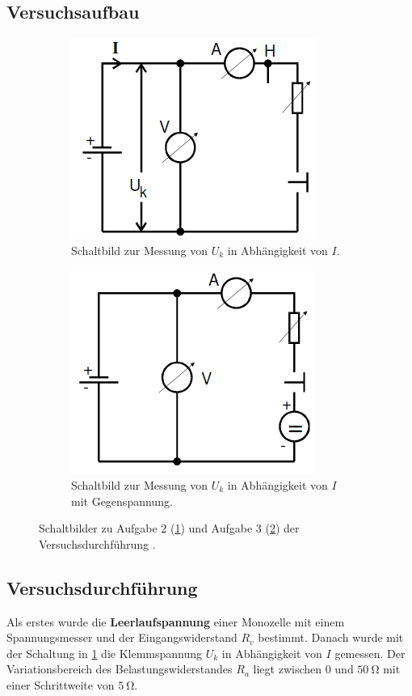 \subsection{Versuchsaufbau}
\begin{figure}
  \centering
  \begin{subfigure}{0.45\textwidth}
    \centering
    \includegraphics[scale=0.6]{durch.png}
    \caption{Schaltbild zur Messung von $U_k$ in Abhängigkeit von $I$.}
    \label{sub:1}
    \qquad
  \end{subfigure}
  \begin{subfigure}{0.45\textwidth}
    \centering
    \includegraphics[scale=0.6]{durch2.png}
    \caption{Schaltbild zur Messung von $U_k$ in Abhängigkeit von $I$ mit Gegenspannung.}
    \label{sub:2}
    \qquad
  \end{subfigure}
  \caption{Schaltbilder zu Aufgabe 2 (\ref{sub:1}) und Aufgabe 3 (\ref{sub:2})
  der Versuchsdurchführung \cite{anleitung}.}
  \label{fig:2}
\end{figure}
\subsection{Versuchsdurchführung}
\label{sec:3.2}
Als erstes wurde die \textbf{Leerlaufspannung} einer Monozelle mit einem Spannungsmesser
und der Eingangswiderstand $R_v$ bestimmt. Danach wurde mit der Schaltung in \ref{sub:1}
die Klemmspannung $U_k$ in Abhängigkeit von $I$ gemessen. Der Variationsbereich des
Belastungswiderstandes $R_a$ liegt zwischen 0 und $\SI{50}{\ohm}$ mit einer
Schrittweite von $\SI{5}{\ohm}$.

